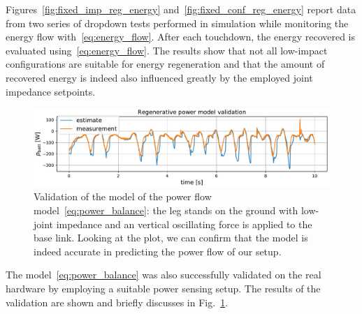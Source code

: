 Figures~\ref{fig:fixed_imp_reg_energy} and~\ref{fig:fixed_conf_reg_energy} report data from two series of dropdown tests performed in simulation while monitoring the energy flow with~\eqref{eq:energy_flow}. 
After each touchdown, the energy recovered is evaluated using~\eqref{eq:energy_flow}. The results show that not all low-impact configurations are suitable for energy regeneration and that the amount of recovered energy is indeed also influenced greatly by the employed joint impedance setpoints. 
\begin{figure}[h]
    \centering
    \includegraphics[width=1.0\columnwidth]{images/reg_pow_tracking.pdf}
    \caption{Validation of the model of the power flow model~\eqref{eq:power_balance}: the leg stands on the ground with low-joint impedance and an vertical oscillating force is applied to the base link. Looking at the plot, we can confirm that the model is indeed accurate in predicting the power flow of our setup.}
    \label{fig:reg_pow_model_tracking}
\end{figure}
The model~\eqref{eq:power_balance} was also successfully validated on the real hardware by employing a suitable power sensing setup. The results of the validation are shown and briefly discusses in Fig.~\ref{fig:reg_pow_model_tracking}. 
